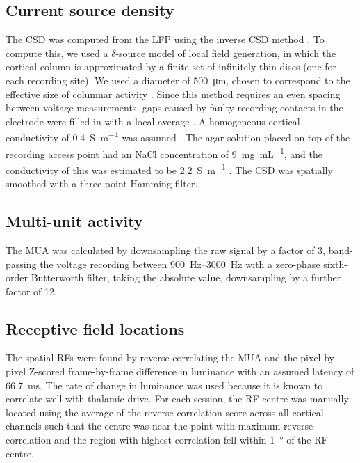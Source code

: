 \subsection{Current source density}
\label{sec:lam_csd}

The \ac{CSD} was computed from the \ac{LFP} using the inverse \ac{CSD} method \citep{Pettersen2006}.
To compute this, we used a $\delta$-source model of local field generation, in which the cortical column is approximated by a finite set of infinitely thin discs (one for each recording site).
We used a diameter of \SI{500}{\micro\metre}, chosen to correspond to the effective size of columnar activity \citep{Horton2005,Lund2003}.
Since this method requires an even spacing between voltage measurements, gaps caused by faulty recording contacts in the electrode were filled in with a local average \citep{Wojcik2010}.
A homogeneous cortical conductivity of \SI{0.4}{\siemens\per\metre} was assumed \citep{Logothetis2007}.
The agar solution placed on top of the recording access point had an \ac{NaCl} concentration of \SI{9}{\mg\per\mL}, and the conductivity of this was estimated to be \SI{2.2}{\siemens\per\metre} \citep{Kandadai2012}.
The \ac{CSD} was spatially smoothed with a three-point Hamming filter.


\subsection{Multi-unit activity}


The \ac{MUA} was calculated by downsampling the raw signal by a factor of \num{3}, band-passing the voltage recording between \SIrange{900}{3000}{Hz} with a zero-phase sixth-order Butterworth filter, taking the absolute value, downsampling by a further factor of \num{12}.


\subsection{Receptive field locations}
\label{sec:lam_rf}

The spatial \acp{RF} were found by reverse correlating the \ac{MUA} and the pixel-by-pixel Z-scored frame-by-frame difference in luminance with an assumed latency of \SI{66.7}{\milli\second}.
The rate of change in luminance was used because it is known to correlate well with thalamic drive.
For each session, the \ac{RF} centre was manually located using the average of the reverse correlation score across all cortical channels such that the centre was near the point with maximum reverse correlation and the region with highest correlation fell within \SI{1}{\degree} of the \ac{RF} centre.



